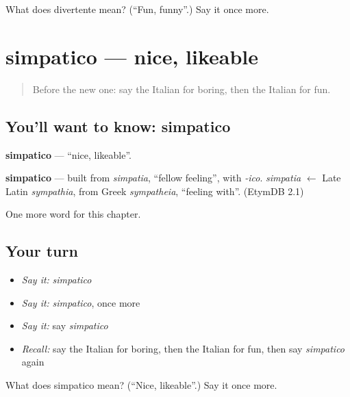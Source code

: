 \begin{tcolorbox}[breakable,colback=teal!4,colframe=teal!35!black,title={Before you move on}]
What does divertente mean? (\textquotedblleft{}Fun, funny\textquotedblright{}.) Say it once more.
\end{tcolorbox}
\section[simpatico]{simpatico — nice, likeable}

\label{lesson:IT-C126-simpatico}



\begin{quote}
Before the new one: say the Italian for boring, then the Italian for fun.
\end{quote}

\subsection*{You'll want to know: simpatico}
\textbf{simpatico} — \textquotedblleft{}nice, likeable\textquotedblright{}.

\begin{cousinweb}
\textbf{simpatico} — built from \emph{simpatia}, \textquotedblleft{}fellow feeling\textquotedblright{}, with \emph{-ico}. \emph{simpatia} $\leftarrow$ Late Latin \emph{sympathia}, from Greek \emph{sympatheia}, \textquotedblleft{}feeling with\textquotedblright{}. (EtymDB 2.1)
\end{cousinweb}

\begin{grammarlens}[title={What you've built}]
One more word for this chapter.
\end{grammarlens}

\subsection*{Your turn}
\begin{itemize}
\raggedright
  \item \emph{Say it:} \emph{simpatico}
  \item \emph{Say it:} \emph{simpatico}, once more
  \item \emph{Say it:} say \emph{simpatico}
  \item \emph{Recall:} say the Italian for boring, then the Italian for fun, then say \emph{simpatico} again
\end{itemize}

\begin{tcolorbox}[breakable,colback=teal!4,colframe=teal!35!black,title={Before you move on}]
What does simpatico mean? (\textquotedblleft{}Nice, likeable\textquotedblright{}.) Say it once more.
\end{tcolorbox}

